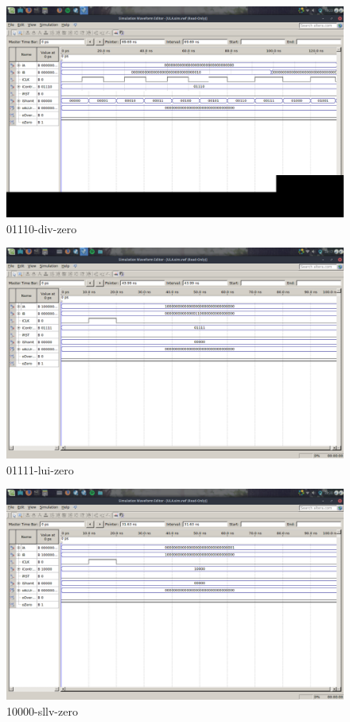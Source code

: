 \documentclass[12pt]{article}
\begin{document}
\begin{figure}[H]
	\centering
	\includegraphics[width=.8\textwidth]{01110-div-zero.png}
	\caption{01110-div-zero}
	\label{fig:01110-div-zero}
\end{figure}

\begin{figure}[H]
	\centering
	\includegraphics[width=.8\textwidth]{01111-lui-zero.png}
	\caption{01111-lui-zero}
	\label{fig:01111-lui-zero}
\end{figure}

\begin{figure}[H]
	\centering
	\includegraphics[width=.8\textwidth]{10000-sllv-zero.png}
	\caption{10000-sllv-zero}
	\label{fig:10000-sllv-zero}
\end{figure}
\end{document}
